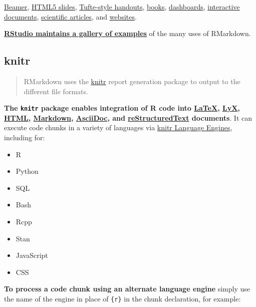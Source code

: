 \documentclass[]{book}
\providecommand{\tightlist}{%
  \setlength{\itemsep}{0pt}\setlength{\parskip}{0pt}}
\theoremstyle{definition}
\theoremstyle{definition}
\theoremstyle{definition}
\theoremstyle{remark}
\begin{document}
\href{https://rmarkdown.rstudio.com/beamer_presentation_format.html}{Beamer},
\href{https://rmarkdown.rstudio.com/ioslides_presentation_format.html}{HTML5
slides},
\href{https://rmarkdown.rstudio.com/tufte_handout_format.html}{Tufte-style
handouts}, \href{https://bookdown.org/yihui/bookdown/}{books},
\href{https://rmarkdown.rstudio.com/flexdashboard/}{dashboards},
\href{https://rmarkdown.rstudio.com/authoring_shiny.html}{interactive
documents}, \href{https://github.com/rstudio/rticles}{scientific
articles}, and
\href{https://rmarkdown.rstudio.com/rmarkdown_websites.html}{websites}.

\href{https://rmarkdown.rstudio.com/gallery.html}{\textbf{RStudio
maintains a gallery of examples}} of the many uses of RMarkdown.

\hypertarget{knitr}{%
\subsection{knitr}\label{knitr}}

\begin{quote}
RMarkdown uses the \href{https://yihui.name/knitr/}{knitr} report
generation package to output to the different file formats.
\end{quote}

\textbf{The \texttt{knitr} package enables integration of R code into
\href{https://en.wikipedia.org/wiki/LaTeX}{LaTeX},
\href{https://en.wikipedia.org/wiki/LyX}{LyX},
\href{https://en.wikipedia.org/wiki/HTML}{HTML},
\href{https://en.wikipedia.org/wiki/Markdown}{Markdown},
\href{https://en.wikipedia.org/wiki/AsciiDoc}{AsciiDoc}, and
\href{https://en.wikipedia.org/wiki/ReStructuredText}{reStructuredText}
documents}. It can execute code chunks in a variety of languages via
\href{https://rmarkdown.rstudio.com/authoring_knitr_engines.html}{knitr
Language Engines}, including for:

\begin{itemize}
\tightlist
\item
  R
\item
  Python
\item
  SQL
\item
  Bash
\item
  Rcpp
\item
  Stan
\item
  JavaScript
\item
  CSS
\end{itemize}

\textbf{To process a code chunk using an alternate language engine}
simply use the name of the engine in place of \texttt{\{r\}} in the
chunk declaration, for example:
\end{document}
